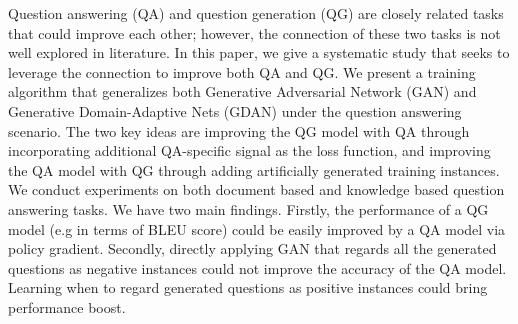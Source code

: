 Question answering (QA) and question generation (QG) are closely related tasks that could improve each other; however, the connection of these two tasks is not well explored in literature. In this paper, we give a systematic study that seeks to leverage the connection to improve both QA and QG. We present a training algorithm that generalizes both Generative Adversarial Network (GAN) and Generative Domain-Adaptive Nets (GDAN) under the question answering scenario. The two key ideas are improving the QG model with QA through incorporating additional QA-specific signal as the loss function, and improving the QA model with QG through adding artificially generated training instances. We conduct experiments on both document based and knowledge based question answering tasks. We have two main findings. Firstly, the performance of a QG model (e.g in terms of BLEU score) could be easily improved by a QA model via policy gradient. Secondly, directly applying GAN that regards all the generated questions as negative instances could not improve the accuracy of the QA model. Learning when to regard generated questions as positive instances could bring performance boost.
